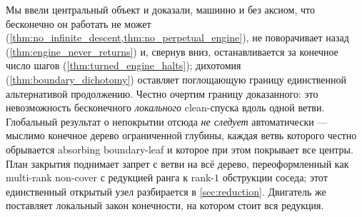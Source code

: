 Мы ввели центральный объект и доказали, машинно и без аксиом, что бесконечно он работать не может
(\cref{thm:no_infinite_descent,thm:no_perpetual_engine}), не поворачивает назад
(\cref{thm:engine_never_returns}) и, свернув вниз, останавливается за конечное число шагов
(\cref{thm:turned_engine_halts}); дихотомия (\cref{thm:boundary_dichotomy}) оставляет поглощающую
границу единственной альтернативой продолжению. Честно очертим границу доказанного: это невозможность
бесконечного \emph{локального} clean-спуска вдоль одной ветви. Глобальный результат о непокрытии отсюда
\emph{не следует} автоматически --- мыслимо конечное дерево ограниченной глубины, каждая ветвь которого
честно обрывается absorbing boundary-leaf и которое при этом покрывает все центры. План закрытия
поднимает запрет с ветви на всё дерево, переоформленный как multi-rank non-cover с редукцией ранга к
rank-$1$ обструкции соседа; этот единственный открытый узел разбирается в \cref{sec:reduction}.
Двигатель же поставляет локальный закон конечности, на котором стоит вся редукция.
